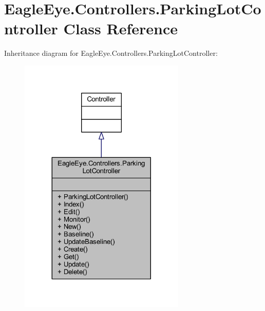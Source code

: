 \hypertarget{class_eagle_eye_1_1_controllers_1_1_parking_lot_controller}{}\section{Eagle\+Eye.\+Controllers.\+Parking\+Lot\+Controller Class Reference}
\label{class_eagle_eye_1_1_controllers_1_1_parking_lot_controller}


Inheritance diagram for Eagle\+Eye.\+Controllers.\+Parking\+Lot\+Controller\+:\nopagebreak
\begin{figure}[H]
\begin{center}
\leavevmode
\includegraphics[width=224pt]{class_eagle_eye_1_1_controllers_1_1_parking_lot_controller__inherit__graph}
\end{center}
\end{figure}


